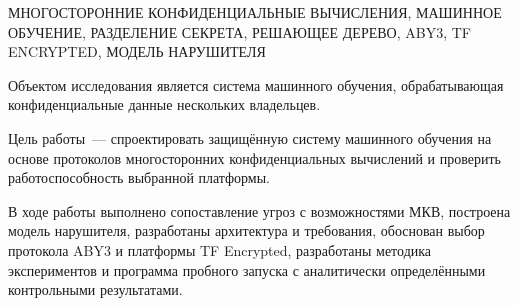 \abstract

МНОГОСТОРОННИЕ КОНФИДЕНЦИАЛЬНЫЕ ВЫЧИСЛЕНИЯ, МАШИННОЕ ОБУЧЕНИЕ,
РАЗДЕЛЕНИЕ СЕКРЕТА, РЕШАЮЩЕЕ ДЕРЕВО, ABY3, TF ENCRYPTED, МОДЕЛЬ НАРУШИТЕЛЯ

Объектом исследования является система машинного обучения, обрабатывающая
конфиденциальные данные нескольких владельцев.

Цель работы~--- спроектировать защищённую систему машинного обучения на основе
протоколов многосторонних конфиденциальных вычислений и проверить
работоспособность выбранной платформы.

В ходе работы выполнено сопоставление угроз с возможностями МКВ, построена
модель нарушителя, разработаны архитектура и требования, обоснован выбор
протокола ABY3 и платформы TF Encrypted, разработаны методика экспериментов и программа
пробного запуска с аналитически определёнными контрольными результатами.
